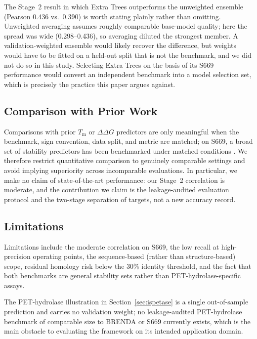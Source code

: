 \documentclass[journal,article,submit,moreauthors]{Definitions/mdpi}
\newcommand{\ddg}{\ensuremath{\Delta\Delta G}}
\newcommand{\Tm}{\ensuremath{T_\mathrm{m}}}
\begin{document}
The Stage~2 result in which Extra Trees outperforms the unweighted ensemble
(Pearson 0.436 vs.\ 0.390) is worth stating plainly rather than omitting. Unweighted
averaging assumes roughly comparable base-model quality; here the spread was wide
(0.298--0.436), so averaging diluted the strongest member. A validation-weighted ensemble
would likely recover the difference, but weights would have to be fitted on a held-out
split that is not the benchmark, and we did not do so in this study. Selecting Extra Trees
on the basis of its S669 performance would convert an independent benchmark into a model
selection set, which is precisely the practice this paper argues against.

\subsection{Comparison with Prior Work}

Comparisons with prior \Tm{} or \ddg{} predictors are only meaningful when the benchmark,
sign convention, data split, and metric are matched; on S669, a broad set of stability
predictors has been benchmarked under matched conditions \citep{pancotti2022s669}. We
therefore restrict quantitative comparison to genuinely comparable settings and avoid
implying superiority across incomparable evaluations. In particular, we make no claim of
state-of-the-art performance: our Stage~2 correlation is moderate, and the contribution we
claim is the leakage-audited evaluation protocol and the two-stage separation of targets,
not a new accuracy record.

\subsection{Limitations}

Limitations include the moderate correlation on S669, the low recall at high-precision
operating points, the sequence-based (rather than structure-based) scope, residual homology
risk below the 30\% identity threshold, and the fact that both benchmarks are general
stability sets rather than PET-hydrolase-specific assays.

The PET-hydrolase illustration in Section~\ref{sec:ispetase} is a single out-of-sample
prediction and carries no validation weight; no leakage-audited PET-hydrolase benchmark of
comparable size to BRENDA or S669 currently exists, which is the main obstacle to
evaluating the framework on its intended application domain.
\end{document}
